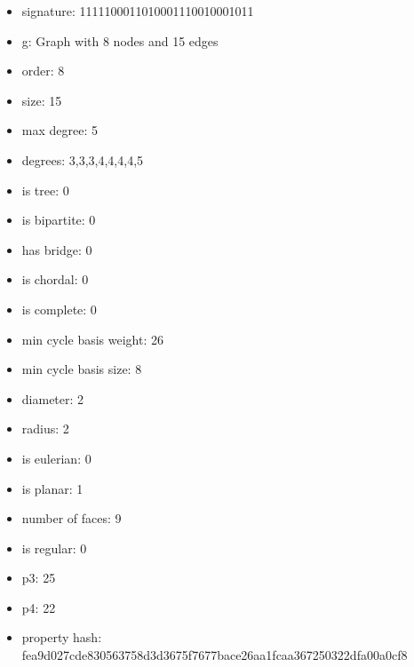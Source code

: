 \begin{itemize}
\item signature: 1111100011010001110010001011
\item g: Graph with 8 nodes and 15 edges
\item order: 8
\item size: 15
\item max degree: 5
\item degrees: 3,3,3,4,4,4,4,5
\item is tree: 0
\item is bipartite: 0
\item has bridge: 0
\item is chordal: 0
\item is complete: 0
\item min cycle basis weight: 26
\item min cycle basis size: 8
\item diameter: 2
\item radius: 2
\item is eulerian: 0
\item is planar: 1
\item number of faces: 9
\item is regular: 0
\item p3: 25
\item p4: 22
\item property hash: fea9d027cde830563758d3d3675f7677bace26aa1fcaa367250322dfa00a0cf8
\end{itemize}
\newpage
\begin{figure}
\end{figure}
